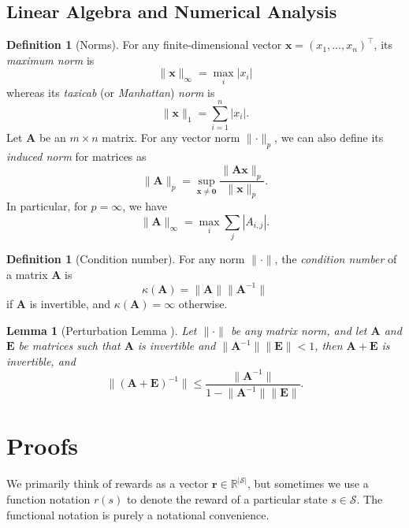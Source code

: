 \documentclass{article}
\newtheorem{lemma}[theorem]{Lemma}
\theoremstyle{definition}
\newtheorem{definition}[theorem]{Definition}
\theoremstyle{remark}
\begin{document}
\subsection{Linear Algebra and Numerical Analysis}

\begin{definition}[Norms]
  For any finite-dimensional vector $\mathbf{x} = (x_1, \dots, x_n)^\intercal$,
  its \emph{maximum norm} is
  \[
    \lVert \mathbf{x} \rVert_\infty = \max_i |x_i|
  \]
  whereas its \emph{taxicab} (or \emph{Manhattan}) \emph{norm} is
  \[
    \lVert \mathbf{x} \rVert_1 = \sum_{i = 1}^n |x_i|.
  \]
  Let $\mathbf{A}$ be an $m \times n$ matrix. For any vector norm $\lVert
  \cdot \rVert_p$, we can also define its \emph{induced norm} for matrices as
  \[
    \lVert \mathbf{A} \rVert_p = \sup_{\mathbf{x} \ne \mathbf{0}} \frac{\lVert
      \mathbf{Ax} \rVert_p}{\lVert \mathbf{x} \rVert_p}.
  \]
  In particular, for $p = \infty$, we have
  \[
    \lVert \mathbf{A} \rVert_\infty = \max_i \sum_{j} |A_{i,j}|.
  \]
\end{definition}

\begin{definition}[Condition number]
  For any norm $\lVert \cdot \rVert$, the \emph{condition number} of a matrix
  $\mathbf{A}$ is
  \[
    \kappa(\mathbf{A}) = \lVert \mathbf{A} \rVert \lVert \mathbf{A}^{-1} \rVert
  \]
  if $\mathbf{A}$ is invertible, and $\kappa(\mathbf{A}) = \infty$ otherwise.
\end{definition}

\begin{lemma}[Perturbation Lemma
  \cite{layton2014numerical}] \label{prop:condition_number}
  Let $\lVert \cdot \rVert$ be any matrix norm, and let $\mathbf{A}$ and
  $\mathbf{E}$ be matrices such that $\mathbf{A}$ is invertible and $\lVert
  \mathbf{A}^{-1} \rVert \lVert \mathbf{E} \rVert < 1$, then $\mathbf{A} +
  \mathbf{E}$ is invertible, and
  \[
    \lVert (\mathbf{A} + \mathbf{E})^{-1} \rVert \le \frac{\lVert
      \mathbf{A}^{-1} \rVert}{1 - \lVert \mathbf{A}^{-1} \rVert \lVert
      \mathbf{E} \rVert}.
  \]
\end{lemma}

\section{Proofs}

We primarily think of rewards as a vector $\mathbf{r} \in
\mathbb{R}^{|\mathcal{S}|}$, but sometimes we use a function notation $r(s)$ to
denote the reward of a particular state $s \in \mathcal{S}$. The functional
notation is purely a notational convenience.
\end{document}
